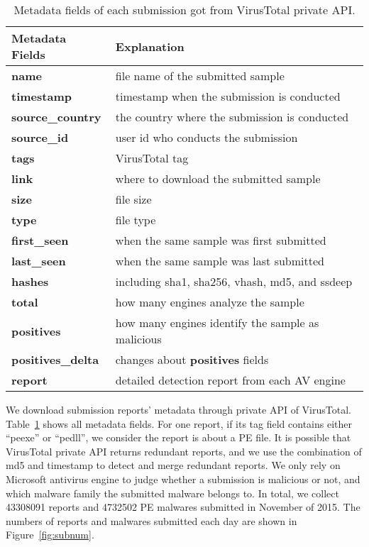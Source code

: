 \begin{table}[h!]
\centering
\footnotesize
{
\begin{tabular}{l|l}
\hline
Metadata Fields & Explanation \\
\hline                            
{\bf name}      & file name of the submitted sample \\
{\bf timestamp} & timestamp when the submission is conducted \\
{\bf source\_country} & the country where the submission is conducted \\
{\bf source\_id} & user id who conducts the submission\\
{\bf tags} & VirusTotal tag \\
{\bf link} & where to download the submitted sample \\
{\bf size} & file size \\
{\bf type} & file type \\
{\bf first\_seen} & when the same sample was first submitted \\
{\bf last\_seen} & when the same sample was last submitted \\
{\bf hashes} & including sha1, sha256, vhash, md5, and ssdeep\\
{\bf total} & how many engines analyze the sample\\
{\bf positives} & how many engines identify the sample as malicious \\
{\bf positives\_delta} & changes about {\bf positives} fields \\
{\bf report} & detailed detection report from each AV engine \\
\hline

\end{tabular}
}
\caption{Metadata fields of each submission got from VirusTotal private API.}
\label{tab:fields}
\end{table}

We download submission reports' metadata through private API of VirusTotal.
Table~\ref{tab:fields} shows all metadata fields.
For one report, if its tag field contains either ``peexe'' or ``pedll'', 
we consider the report is about a PE file. 
It is possible that VirusTotal private API returns redundant reports, 
and we use the combination of md5 and timestamp to detect and merge redundant reports.
We only rely on Microsoft antivirus engine to judge whether a submission is malicious or not, 
and which malware family the submitted malware belongs to. 
In total, we collect 43308091 reports and 4732502 PE malwares submitted
in November of 2015. 
The numbers of reports and malwares submitted each day are shown in Figure~\ref{fig:subnum}.

